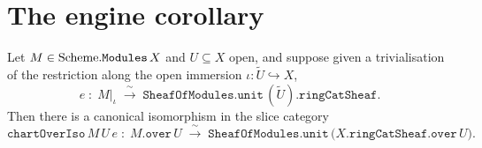 \section{The engine corollary}
\label{mk-sec:soe_chart}

\begin{lemma}\label{mk-lem:chart_over_iso}
  \leanok

  Let \(M \in \mathrm{Scheme}.\mathtt{Modules}\,X\) and \(U \subseteq X\) open, and suppose
  given a trivialisation of the restriction along the open immersion
  \(\iota : \widetilde{U} \hookrightarrow X\),
  \[
    e \;:\; M|_\iota \;\xrightarrow{\ \sim\ }\;
      \mathtt{SheafOfModules.unit}\,(\widetilde{U}).\mathtt{ringCatSheaf}.
  \]
  Then there is a canonical isomorphism in the slice category
  \[
    \mathtt{chartOverIso}\,M\,U\,e \;:\;
      M.\mathtt{over}\,U \;\xrightarrow{\ \sim\ }\;
      \mathtt{SheafOfModules.unit}\,\bigl(X.\mathtt{ringCatSheaf}.\mathtt{over}\,U\bigr).
  \]
\end{lemma}

